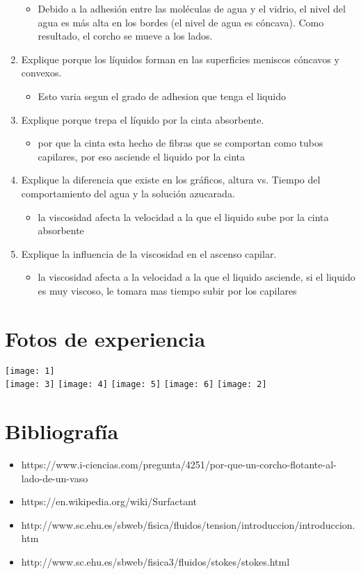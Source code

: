 \documentclass[11pt, letterpaper]{article}
\begin{document}
\begin{enumerate}
\begin{itemize}
     \item Debido a la adhesión entre las moléculas de agua y el vidrio, el nivel del agua es más alta en los bordes (el nivel de agua es cóncava). Como resultado, el corcho se mueve a los lados.
   \end{itemize}
   \item Explique porque los líquidos forman en las superficies meniscos cóncavos y convexos.
   \begin{itemize}
     \item Esto varia segun el grado de adhesion que tenga el liquido
   \end{itemize}
   \item Explique porque trepa el líquido por la cinta absorbente.
   \begin{itemize}
     \item por que la cinta esta hecho de fibras que se comportan como tubos capilares, por eso asciende el liquido por la cinta
   \end{itemize}
   \item Explique la diferencia que existe en los gráficos, altura vs. Tiempo del comportamiento del agua y la solución azucarada.
   \begin{itemize}
     \item la viscosidad afecta la velocidad a la que el liquido sube por la cinta absorbente
   \end{itemize}
   \item Explique la influencia de la viscosidad en el ascenso capilar.
   \begin{itemize}
     \item la viscosidad afecta a la velocidad a la que el liquido asciende, si el liquido es muy viscoso, le tomara mas tiempo subir por los capilares
   \end{itemize}
   
\end{enumerate}
\section{Fotos de experiencia}
\texttt{[image: 1]}\\

\texttt{[image: 3]}
\texttt{[image: 4]}
\texttt{[image: 5]}
\texttt{[image: 6]}
\texttt{[image: 2]}
\section{Bibliografía}
\begin{itemize}
\item https://www.i-ciencias.com/pregunta/4251/por-que-un-corcho-flotante-al-lado-de-un-vaso
\item https://en.wikipedia.org/wiki/Surfactant
\item http://www.sc.ehu.es/sbweb/fisica/fluidos/tension/introduccion/introduccion.htm
\item http://www.sc.ehu.es/sbweb/fisica3/fluidos/stokes/stokes.html
\end{itemize}
\end{document}
